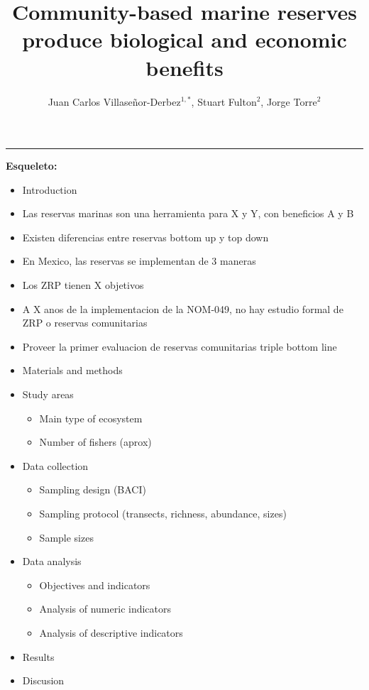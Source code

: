 \documentclass{frontiersSCNS}
\def\firstAuthorLast{Villaseñor-Derbez {et~al.}}
\def\Authors{Juan Carlos Villaseñor-Derbez\(^{1,*}\), Stuart Fulton\(^{2}\), Jorge
Torre\(^{2}\)}
\begin{document}
\onecolumn
{}

\title[Mexican marine reserves]{Community-based marine reserves produce biological and economic benefits} 

\author[\firstAuthorLast ]{\Authors} %
\address{} %
\correspondance{} %

\extraAuth{}

\maketitle



\begin{center}\rule{0.5\linewidth}{\linethickness}\end{center}

\textbf{Esqueleto:}

\begin{itemize}
\item
  Introduction
\item
  Las reservas marinas son una herramienta para X y Y, con beneficios A
  y B
\item
  Existen diferencias entre reservas bottom up y top down
\item
  En Mexico, las reservas se implementan de 3 maneras
\item
  Los ZRP tienen X objetivos
\item
  A X anos de la implementacion de la NOM-049, no hay estudio formal de
  ZRP o reservas comunitarias
\item
  Proveer la primer evaluacion de reservas comunitarias triple bottom
  line
\item
  Materials and methods
\item
  Study areas

  \begin{itemize}
  \item
    Main type of ecosystem
  \item
    Number of fishers (aprox)
  \end{itemize}
\item
  Data collection

  \begin{itemize}
  \item
    Sampling design (BACI)
  \item
    Sampling protocol (transects, richness, abundance, sizes)
  \item
    Sample sizes
  \end{itemize}
\item
  Data analysis

  \begin{itemize}
  \item
    Objectives and indicators
  \item
    Analysis of numeric indicators
  \item
    Analysis of descriptive indicators
  \end{itemize}
\item
  Results
\item
  Discusion
\end{itemize}
\end{document}
